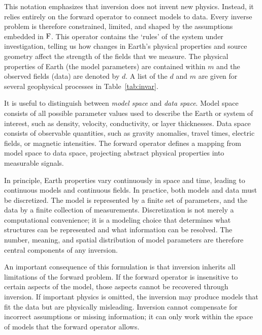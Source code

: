 This notation emphasizes that inversion does not invent new physics. Instead, it relies entirely on the forward operator to connect models to data. Every inverse problem is therefore constrained, limited, and shaped by the assumptions embedded in $\operatorname{F}$. This operator contains the `rules' of the system under investigation, telling us how changes in Earth's physical properties and source geometry affect the strength of the fields that we measure.  The physical properties of Earth (the model parameters) are contained within $m$ and the observed fields (data) are denoted by $d$.  A list of the $d$ and $m$ are given for several geophysical processes in Table~\ref{tab:invar}.


It is useful to distinguish between \emph{model space} and \emph{data space}. Model space consists of all possible parameter values used to describe the Earth or system of interest, such as density, velocity, conductivity, or layer thicknesses. Data space consists of observable quantities, such as gravity anomalies, travel times, electric fields, or magnetic intensities. The forward operator defines a mapping from model space to data space, projecting abstract physical properties into measurable signals.

In principle, Earth properties vary continuously in space and time, leading to continuous models and continuous fields. In practice, both models and data must be discretized. The model is represented by a finite set of parameters, and the data by a finite collection of measurements. Discretization is not merely a computational convenience; it is a modeling choice that determines what structures can be represented and what information can be resolved. The number, meaning, and spatial distribution of model parameters are therefore central components of any inversion.

An important consequence of this formulation is that inversion inherits all limitations of the forward problem. If the forward operator is insensitive to certain aspects of the model, those aspects cannot be recovered through inversion. If important physics is omitted, the inversion may produce models that fit the data but are physically misleading. Inversion cannot compensate for incorrect assumptions or missing information; it can only work within the space of models that the forward operator allows.


